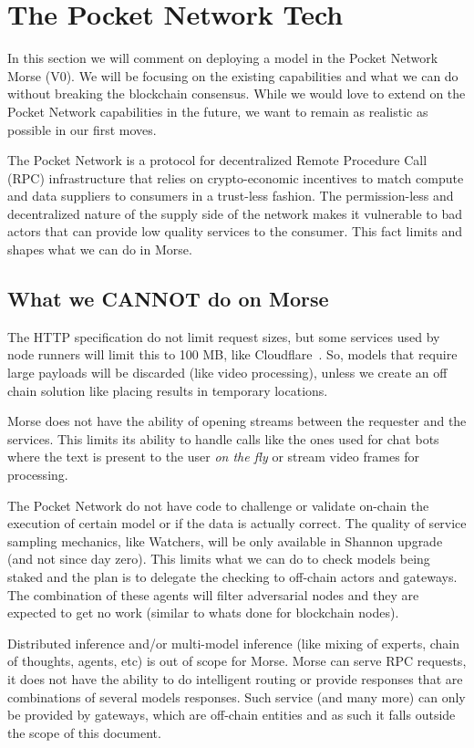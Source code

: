 \section{The Pocket Network Tech}\label{sec:ref}

In this section we will comment on deploying a model in the Pocket Network Morse (V0).
We will be focusing on the existing capabilities and what we can do without breaking the blockchain consensus. While we would love to extend on the Pocket Network capabilities in the future, we want to remain as realistic as possible in our first moves.

The Pocket Network is a protocol for decentralized Remote Procedure Call (RPC) infrastructure that relies on crypto-economic incentives to match compute and data suppliers to consumers in a trust-less fashion. The permission-less and decentralized nature of the supply side of the network makes it vulnerable to bad actors that can provide low quality services to the consumer. This fact limits and shapes what we can do in Morse.


\subsection{What we CANNOT do on Morse}
The HTTP specification do not limit request sizes, but some services used by node runners will limit this to 100 MB, like Cloudflare~\cite{cloudflareLimitsCloudflare}. So, models that require large payloads will be discarded (like video processing), unless we create an off chain solution like placing results in temporary locations.

Morse does not have the ability of opening streams between the requester and the services. This limits its ability to handle calls like the ones used for chat bots where the text is present to the user \emph{on the fly} or stream video frames for processing.

The Pocket Network do not have code to challenge or validate on-chain the execution of certain model or if the data is actually correct. The quality of service sampling mechanics, like Watchers, will be only available in Shannon upgrade (and not since day zero). This limits what we can do to check models being staked and the plan is to delegate the checking to off-chain actors and gateways. The combination of these agents will filter adversarial nodes and they are expected to get no work (similar to whats done for blockchain nodes).

Distributed inference and/or multi-model inference (like mixing of experts, chain of thoughts, agents, etc) is out of scope for Morse. Morse can serve RPC requests, it does not have the ability to do intelligent routing or provide responses that are combinations of several models responses. Such service (and many more) can only be provided by gateways, which are off-chain entities and as such it falls outside the scope of this document.



